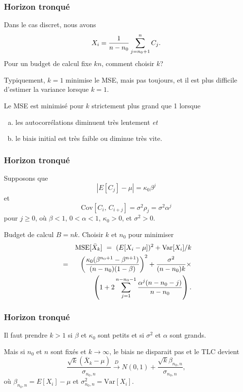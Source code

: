 \documentclass[t,usepdftitle=false]{beamer}
\def\MSE{\mbox{MSE}}
\def\Var{\mbox{Var}}
\def\Cov{\mbox{Cov}}
\def\To{\overset{D}{\to}}
\begin{document}
\begin{frame}
\frametitle{Horizon tronqué}

Dans le cas discret, nous avons
\[
  {X_i} = {1\over n-n_0} \sum_{j=n_0+1}^{n} C_j.
\]
Pour un budget de calcul fixe $kn$, comment choisir $k$?

\mbox{}

Typiquement, $k=1$ minimise le MSE, mais pas toujours,
et il est plus difficile d'estimer la variance lorsque $k=1$.

\mbox{}

Le MSE est minimisé pour $k$ strictement plus grand que 1 lorsque
\begin{enumerate}[(a)]
\item
les autocorrélations diminuent très lentement \emph{et}
\item
le biais initial est très faible ou diminue très vite.
\end{enumerate}

\end{frame}

\begin{frame}
\frametitle{Horizon tronqué}

Supposons que
\[
|E[C_j] - \mu| = {\kappa_0 \beta}^j
\]
et
\[
\Cov[C_i,\, C_{i+j}] = \sigma^2 \rho_j = \sigma^2{\alpha}^j
\]
pour $j\ge 0$, où $\beta < 1$, $0<\alpha<1$, $\kappa_0 > 0$,
et $\sigma^2 > 0$.

\mbox{}

Budget de calcul ${B} = nk$. Choisir ${k}$ et ${n_0}$ pour minimiser
\begin{eqnarray*}
 && \MSE[\bar X_k] ~=~  (E[X_i-\mu])^2 + \Var[X_i]/k \\
 &=& \left({\kappa_0(\beta^{n_0+1}-\beta^{n+1}) 
       \over (n-n_0)(1-\beta)}\right)^2
  + \frac{\sigma^2}{(n-n_0)k} \times \\ 
 &&  \left(1+2\sum_{j=1}^{n-n_0-1} \frac{\alpha^j(n-n_0-j)}{n-n_0}\right).
\end{eqnarray*}

\end{frame}

\begin{frame}
\frametitle{Horizon tronqué}

Il faut prendre $k>1$ si $\beta$ et $\kappa_0$ sont petits et 
si $\sigma^2$ et $\alpha$ sont grands.

\mbox{}

Mais si $n_0$ et $n$ sont fixés et $k\to\infty$,
le biais ne disparait pas et le TLC devient
\[
 \frac{\sqrt{k}(\bar X_k - \mu)}{\sigma_{n_0,n}} 
   \To N(0,1) + \frac{\sqrt{k} \beta_{n_0,n}}{\sigma_{n_0,n}},
\]
où ${\beta_{n_0,n}} = E[X_i] - \mu$ et 
${\sigma^2_{n_0,n}} = \Var[X_i]$.

\end{frame}
\end{document}
